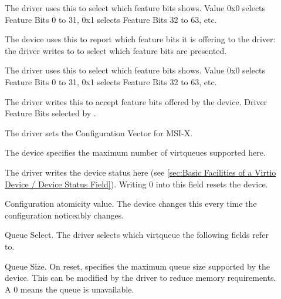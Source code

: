 \begin{description}
\item[]
        The driver uses this to select which feature bits  shows.
        Value 0x0 selects Feature Bits 0 to 31, 0x1 selects Feature Bits 32 to 63, etc.

\item[]
        The device uses this to report which feature bits it is
        offering to the driver: the driver writes to
         to select which feature bits are presented.

\item[]
        The driver uses this to select which feature bits  shows.
        Value 0x0 selects Feature Bits 0 to 31, 0x1 selects Feature Bits 32 to 63, etc.

\item[]
        The driver writes this to accept feature bits offered by the device.
        Driver Feature Bits selected by .

\item[]
        The driver sets the Configuration Vector for MSI-X.

\item[]
        The device specifies the maximum number of virtqueues supported here.

\item[]
        The driver writes the device status here (see \ref{sec:Basic Facilities of a Virtio Device / Device Status Field}). Writing 0 into this
        field resets the device.

\item[]
        Configuration atomicity value.  The device changes this every time the
        configuration noticeably changes.

\item[]
        Queue Select. The driver selects which virtqueue the following
        fields refer to.

\item[]
        Queue Size.  On reset, specifies the maximum queue size supported by
        the device. This can be modified by the driver to reduce memory requirements.
        A 0 means the queue is unavailable.


\end{description}
